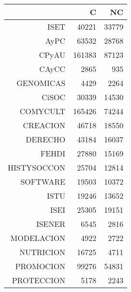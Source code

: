 \begin{table}[ht]
\centering
\begin{tabular}{rrr}
  \hline
 & C & NC \\ 
  \hline
ISET & 40221 & 33779 \\ 
  AyPC & 63532 & 28768 \\ 
  CPyAU & 161383 & 87123 \\ 
  CAyCC & 2865 & 935 \\ 
  GENOMICAS & 4429 & 2264 \\ 
  CiSOC & 30339 & 14530 \\ 
  COMYCULT & 165426 & 74244 \\ 
  CREACION & 46718 & 18550 \\ 
  DERECHO & 43184 & 16037 \\ 
  FEHDI & 27880 & 15169 \\ 
  HISTYSOCCON & 25704 & 12814 \\ 
  SOFTWARE & 19503 & 10372 \\ 
  ISTU & 19246 & 13652 \\ 
  ISEI & 25305 & 19151 \\ 
  ISENER & 6545 & 2816 \\ 
  MODELACION & 4922 & 2722 \\ 
  NUTRICION & 16725 & 4711 \\ 
  PROMOCION & 99276 & 54831 \\ 
  PROTECCION & 5178 & 2243 \\ 
   \hline
\end{tabular}
\end{table}
